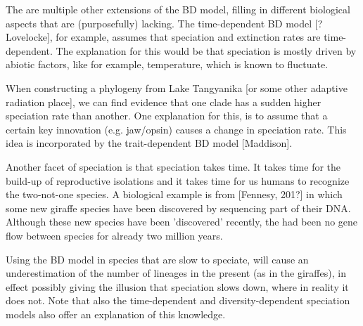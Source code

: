 %
%
%
%
%

The are multiple other extensions of the BD model, filling in different
biological aspects that are (purposefully) lacking. The time-dependent BD 
model [?Lovelocke], for example, assumes that speciation and extinction 
rates are time-dependent. The explanation for this would be that speciation
is mostly driven by abiotic factors, like for example, temperature,
which is known to fluctuate.


When constructing a phylogeny from Lake Tangyanika [or some
other adaptive radiation place], we can find evidence that
one clade has a sudden higher speciation rate than another.
One explanation for this, is to assume that a certain key
innovation (e.g. jaw/opsin) causes a change in speciation
rate. This idea is incorporated by the trait-dependent 
BD model [Maddison].

%
%
%

Another facet of speciation is that speciation takes time. It
takes time for the build-up of reproductive isolations and it
takes time for us humans to recognize the two-not-one species.
A biological example is from [Fennesy, 201?] in which
some new giraffe species have been discovered by sequencing
part of their DNA. Although these new species have been
'discovered' recently, the had been no gene flow between species
for already two million years.

%
%
%

Using the BD model in species that are slow to speciate, will cause
an underestimation of the number of lineages in the present (as in the
giraffes), in effect possibly giving the illusion that speciation 
slows down, where in reality it does not. Note that also the
time-dependent and diversity-dependent speciation models also
offer an explanation of this knowledge.

